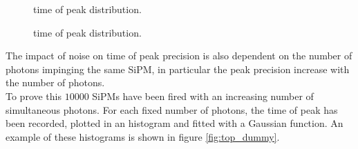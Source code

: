 \begin{figure}
	\centering
	 \quad
	\caption{time of peak distribution.}
	\label{fig:top_per_tau}
\end{figure}

\begin{figure}
	\centering
	 \quad
	\caption{time of peak distribution.}
	\label{fig:top_per_fib}
\end{figure}

The impact of noise on time of peak precision is also dependent on the number of photons impinging the same SiPM, in particular the peak precision increase with the number of photons.\\
To prove this $10000$ SiPMs have been fired with an increasing number of simultaneous photons. For each fixed number of photons, the time of peak has been recorded, plotted in an histogram and fitted with a Gaussian function. An example of these histograms is shown in figure \ref{fig:top_dummy}.\\

